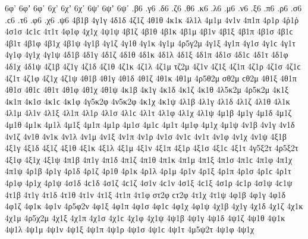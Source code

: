 {6φ' 6φʼ 6φ᾿
6χ' 6χʼ 6χ᾿
6ψ' 6ψʼ 6ψ᾿
.β6
.γ6
.δ6
.ζ6
.θ6
.κ6
.λ6
.μ6
.ν6
.ξ6
.π6
.ρ6
.σ6 .ϲ6
.τ6
.φ6
.χ6
.ψ6
4β1β
4γ1γ
4δ1δ
4ζ1ζ
4θ1θ
4κ1κ
4λ1λ
4μ1μ
4ν1ν
4π1π
4ρ1ρ
4ῤ1ῥ
4σ1σ 4ϲ1ϲ
4τ1τ
4φ1φ
4χ1χ
4ψ1ψ
4β1ζ
4β1θ
4β1κ
4β1μ
4β1ν
4β1ξ
4β1π
4β1σ 4β1ϲ
4β1τ
4β1φ
4β1χ
4β1ψ
4γ1β
4γ1ζ
4γ1θ
4γ1κ
4γ1μ
4ρ5γ2μ   %
4γ1ξ
4γ1π
4γ1σ 4γ1ϲ
4γ1τ
4γ1φ
4γ1χ
4γ1ψ
4δ1β
4δ1γ
4δ1ζ
4δ1θ
4δ1κ
4δ1λ
4δ1ξ
4δ1π
4δ1σ 4δ1ϲ
4δ1τ
4δ1φ
4δ1χ
4δ1ψ
4ζ1β   %
4ζ1γ   %
4ζ1δ
4ζ1θ
4ζ1κ
4ζ1λ
4ζ1μ
τζ2μ   %
4ζ1ν
4ζ1ξ
4ζ1π
4ζ1ρ
4ζ1σ 4ζ1ϲ
4ζ1τ
4ζ1φ
4ζ1χ
4ζ1ψ
4θ1β
4θ1γ
4θ1δ
4θ1ζ
4θ1κ
4θ1μ
4ρ5θ2μ   %
σθ2μ ϲθ2μ   %
4θ1ξ
4θ1π
4θ1σ 4θ1ϲ
4θ1τ
4θ1φ
4θ1χ
4θ1ψ
4κ1β   %
4κ1γ
4κ1δ
4κ1ζ
4κ1θ
4λ5κ2μ   %
4ρ5κ2μ   %
4κ1ξ
4κ1π
4κ1σ 4κ1ϲ
4κ1φ
4γ5κ2φ   %
4ν5κ2φ   %
4κ1χ
4κ1ψ
4λ1β
4λ1γ
4λ1δ
4λ1ζ
4λ1θ
4λ1κ
4λ1μ
4λ1ν
4λ1ξ
4λ1π
4λ1ρ
4λ1σ 4λ1ϲ
4λ1τ
4λ1φ
4λ1χ
4λ1ψ
4μ1β
4μ1γ
4μ1δ
4μ1ζ
4μ1θ
4μ1κ
4μ1λ
4μ1ξ
4μ1π
4μ1ρ
4μ1σ 4μ1ϲ
4μ1τ
4μ1φ
4μ1χ
4μ1ψ
4ν1β
4ν1γ
4ν1δ
4ν1ζ
4ν1θ
4ν1κ
4ν1λ
4ν1μ
4ν1ξ
4ν1π
4ν1ρ
4ν1σ 4ν1ϲ
4ν1τ
4ν1φ
4ν1χ
4ν1ψ
4ξ1β
4ξ1γ
4ξ1δ
4ξ1ζ
4ξ1θ
4ξ1κ
4ξ1λ
4ξ1μ
4ξ1ν
4ξ1π
4ξ1ρ
4ξ1σ 4ξ1ϲ
4ξ1τ
4γ5ξ2τ   %
4ρ5ξ2τ   %
4ξ1φ
4ξ1χ
4ξ1ψ
4π1β
4π1γ
4π1δ
4π1ζ
4π1θ
4π1κ
4π1μ
4π1ξ
4π1σ 4π1ϲ
4π1φ
4π1χ
4π1ψ
4ρ1β
4ρ1γ
4ρ1δ
4ρ1ζ
4ρ1θ
4ρ1κ
4ρ1λ
4ρ1μ
4ρ1ν
4ρ1ξ
4ρ1π
4ρ1σ 4ρ1ϲ
4ρ1τ
4ρ1φ
4ρ1χ
4ρ1ψ
4σ1δ 4ϲ1δ   %
4σ1ζ 4ϲ1ζ
4σ1ν 4ϲ1ν   %
4σ1ξ 4ϲ1ξ
4σ1ρ 4ϲ1ρ
4σ1ψ 4ϲ1ψ
4τ1β
4τ1γ
4τ1δ
4τ1θ
4τ1ν
4τ1ξ
4τ1π
4τ1φ
στ2φ ϲτ2φ   %
4τ1χ
4τ1ψ
4φ1β
4φ1γ
4φ1δ
4φ1ζ
4φ1κ   %
4φ1ν
4ρ5φ2ν   %
4φ1ξ
4φ1π
4φ1σ 4φ1ϲ
4φ1χ
4φ1ψ
4χ1β
4χ1γ
4χ1δ
4χ1ζ
4χ1κ
4χ1μ
4ρ5χ2μ   %
4χ1ξ
4χ1π
4χ1σ 4χ1ϲ
4χ1φ
4χ1ψ
4ψ1β
4ψ1γ
4ψ1δ
4ψ1ζ
4ψ1θ
4ψ1κ
4ψ1λ
4ψ1μ
4ψ1ν
4ψ1ξ
4ψ1π
4ψ1ρ
4ψ1σ 4ψ1ϲ
4ψ1τ
4μ5ψ2τ   %
4ψ1φ
4ψ1χ
}
